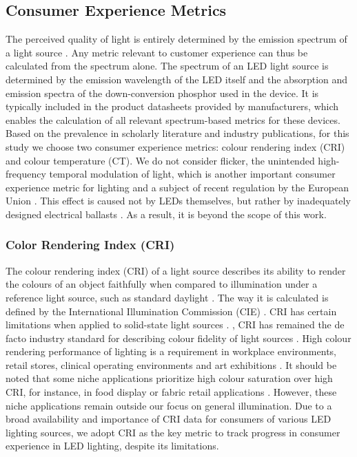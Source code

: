 \documentclass[parskip=full]{article}
\begin{document}
\subsection{Consumer Experience Metrics}

The perceived quality of light is entirely determined by the emission spectrum of a light source \cite{ies_handbook}. Any metric relevant to customer experience can thus be calculated from the spectrum alone. The spectrum of an LED light source is determined by the emission wavelength of the LED itself and the absorption and emission spectra of the down-conversion phosphor used in the device. It is typically included in the product datasheets provided by manufacturers, which enables the calculation of all relevant spectrum-based metrics for these devices. Based on the prevalence in scholarly literature and industry publications, for this study we choose two consumer experience metrics: colour rendering index (CRI) and colour temperature (CT). We do not consider flicker, the unintended high-frequency temporal modulation of light, which is another important consumer experience metric for lighting and a subject of recent regulation by the European Union \cite{weinold2020long}. This effect is caused not by LEDs themselves, but rather by inadequately designed electrical ballasts \cite{Lehman2014}. As a result, it is beyond the scope of this work. 

\subsubsection{Color Rendering Index (CRI)}

The colour rendering index (CRI) of a light source describes its ability to render the colours of an object faithfully when compared to illumination under a reference light source, such as standard daylight \cite{khan2015led}. The way it is calculated is defined by the International Illumination Commission (CIE) \cite{cie_cri_1995}. CRI has certain limitations when applied to solid-state light sources \cite{david2013cri}. \cite{Houser2013}, CRI has remained the de facto industry standard for describing colour fidelity of light sources \cite{DOE2016LED}. High colour rendering performance of lighting is a requirement in workplace environments, retail stores, clinical operating environments and art exhibitions \cite{khanh2017color}. It should be noted that some niche applications prioritize high colour saturation over high CRI, for instance, in food display or fabric retail applications \cite{david2013cri}. However, these niche applications remain outside our focus on general illumination. Due to a broad availability and importance of CRI data for consumers of various LED lighting sources, we adopt CRI as the key metric to track progress in consumer experience in LED lighting, despite its limitations.
\end{document}
